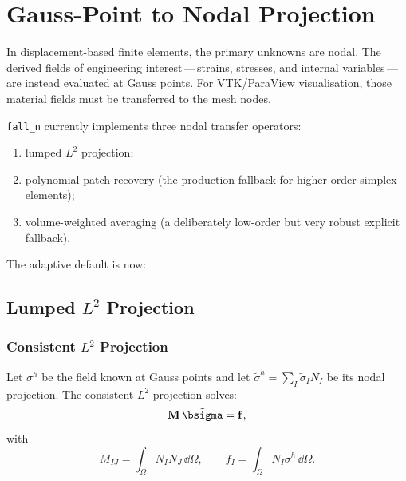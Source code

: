 
\chapter{Gauss-Point to Nodal Projection}
\label{ch:projection}

In displacement-based finite elements, the primary unknowns are nodal.  The
derived fields of engineering interest\,---\,strains, stresses, and internal
variables\,---\,are instead evaluated at Gauss points.  For VTK/ParaView
visualisation, those material fields must be transferred to the mesh nodes.

\texttt{fall\_n} currently implements three nodal transfer operators:
\begin{enumerate}[nosep]
  \item lumped $L^2$ projection;
  \item polynomial patch recovery (the production fallback for higher-order
        simplex elements);
  \item volume-weighted averaging (a deliberately low-order but very robust
        explicit fallback).
\end{enumerate}

The adaptive default is now:
\begin{center}
\end{center}


\section{Lumped \texorpdfstring{$L^2$}{L2} Projection}
\label{sec:l2_projection}

\subsection{Consistent \texorpdfstring{$L^2$}{L2} Projection}

Let $\sigma^h$ be the field known at Gauss points and let
$\tilde{\sigma}^h = \sum_I \tilde{\sigma}_I N_I$ be its nodal projection.
The consistent $L^2$ projection solves:
\begin{equation}
  \mathbf{M}\,\tilde{\bsigma} = \mathbf{f},
  \label{eq:consistent_L2}
\end{equation}
with
\begin{equation}
  M_{IJ} = \int_\Omega N_I N_J \,\dd\Omega,
  \qquad
  f_I = \int_\Omega N_I \sigma^h \,\dd\Omega.
\end{equation}

